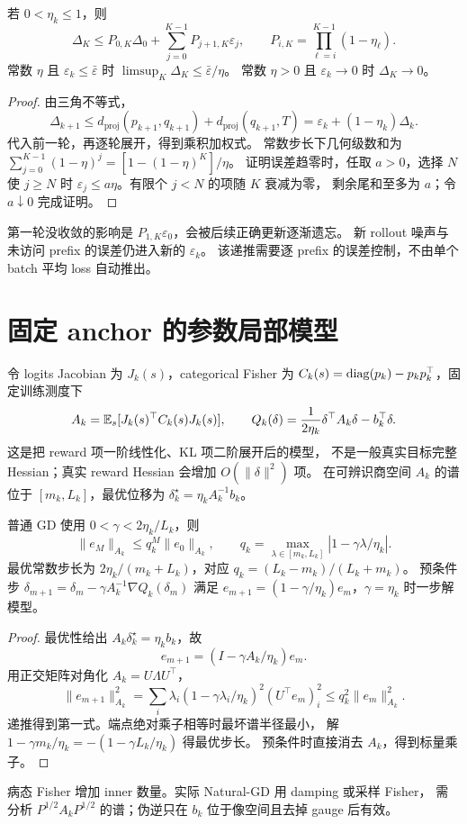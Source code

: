 \begin{theorem}\label{thm:inexact}
若 $0<\eta_k\le1$，则
\[
 \Delta_K\le P_{0,K}\Delta_0+
 \sum_{j=0}^{K-1}P_{j+1,K}\varepsilon_j,\qquad
 P_{i,K}=\prod_{\ell=i}^{K-1}(1-\eta_\ell).
\]
常数 $\eta$ 且 $\varepsilon_k\le\bar\varepsilon$ 时
$\limsup_K\Delta_K\le\bar\varepsilon/\eta$。
常数 $\eta>0$ 且 $\varepsilon_k\to0$ 时 $\Delta_K\to0$。
\end{theorem}
\begin{proof}
由三角不等式，
\[
 \Delta_{k+1}\le d_{\mathrm{proj}}(p_{k+1},q_{k+1})
             +d_{\mathrm{proj}}(q_{k+1},T)
 =\varepsilon_k+(1-\eta_k)\Delta_k.
\]
代入前一轮，再逐轮展开，得到乘积加权式。
常数步长下几何级数和为
$\sum_{j=0}^{K-1}(1-\eta)^j=[1-(1-\eta)^K]/\eta$。
证明误差趋零时，任取 $a>0$，选择 $N$ 使 $j\ge N$ 时
$\varepsilon_j\le a\eta$。有限个 $j<N$ 的项随 $K$ 衰减为零，
剩余尾和至多为 $a$；令 $a\downarrow0$ 完成证明。
\end{proof}
第一轮没收敛的影响是 $P_{1,K}\varepsilon_0$，会被后续正确更新逐渐遗忘。
新 rollout 噪声与未访问 prefix 的误差仍进入新的 $\varepsilon_k$。
该递推需要逐 prefix 的误差控制，不由单个 batch 平均 loss 自动推出。

\section{固定 anchor 的参数局部模型}
令 logits Jacobian 为 $J_k(s)$，categorical Fisher 为
$C_k(s)=\operatorname{diag}(p_k)-p_kp_k^\top$，固定训练测度下
\[
 A_k=\mathbb{E}_s[J_k(s)^\top C_k(s)J_k(s)],\qquad
 Q_k(\delta)=\frac1{2\eta_k}\delta^\top A_k\delta-b_k^\top\delta.
\]
这是把 reward 项一阶线性化、KL 项二阶展开后的模型，
不是一般真实目标完整 Hessian；真实 reward Hessian 会增加 $O(\|\delta\|^2)$ 项。
在可辨识商空间 $A_k$ 的谱位于 $[m_k,L_k]$，最优位移为
$\delta_k^\star=\eta_k A_k^{-1}b_k$。

\begin{theorem}\label{thm:inner}
普通 GD 使用 $0<\gamma<2\eta_k/L_k$，则
\[
 \|e_M\|_{A_k}\le q_k^M\|e_0\|_{A_k},\qquad
 q_k=\max_{\lambda\in[m_k,L_k]}|1-\gamma\lambda/\eta_k|.
\]
最优常数步长为 $2\eta_k/(m_k+L_k)$，对应
$q_k=(L_k-m_k)/(L_k+m_k)$。
预条件步 $\delta_{m+1}=\delta_m-\gamma A_k^{-1}\nabla Q_k(\delta_m)$
满足 $e_{m+1}=(1-\gamma/\eta_k)e_m$，$\gamma=\eta_k$ 时一步解模型。
\end{theorem}
\begin{proof}
最优性给出 $A_k\delta_k^\star=\eta_kb_k$，故
\[
 e_{m+1}=(I-\gamma A_k/\eta_k)e_m.
\]
用正交矩阵对角化 $A_k=U\Lambda U^\top$，
\[
 \|e_{m+1}\|_{A_k}^2
 =\sum_i\lambda_i(1-\gamma\lambda_i/\eta_k)^2(U^\top e_m)_i^2
 \le q_k^2\|e_m\|_{A_k}^2.
\]
递推得到第一式。端点绝对乘子相等时最坏谱半径最小，
解 $1-\gamma m_k/\eta_k=-(1-\gamma L_k/\eta_k)$ 得最优步长。
预条件时直接消去 $A_k$，得到标量乘子。
\end{proof}
病态 Fisher 增加 inner 数量。实际 Natural-GD 用 damping 或采样 Fisher，
需分析 $P^{1/2}A_kP^{1/2}$ 的谱；伪逆只在 $b_k$ 位于像空间且去掉 gauge 后有效。

